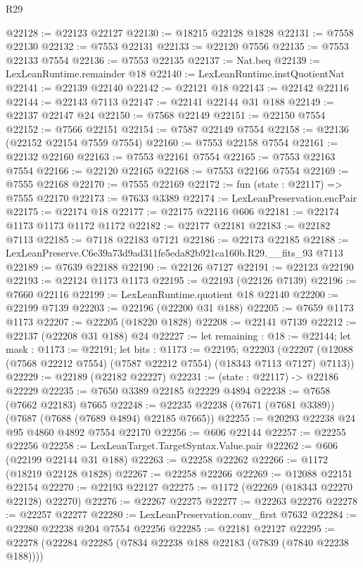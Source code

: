 \begin{lexlean}{R29}
\begin{coremodule}
@22128 := @22123 @22127
@22130 := @18215 @22128 @1828
@22131 := @7558 @22130
@22132 := @7553 @22131
@22133 := @22120 @7556
@22135 := @7553 @22133 @7554
@22136 := @7553 @22135
@22137 := Nat.beq
@22139 := LexLeanRuntime.remainder @18
@22140 := LexLeanRuntime.instQuotientNat
@22141 := @22139 @22140
@22142 := @22121 @18
@22143 := @22142 @22116
@22144 := @22143 @7113
@22147 := @22141 @22144 @31 @188
@22149 := @22137 @22147 @24
@22150 := @7568 @22149
@22151 := @22150 @7554
@22152 := @7566 @22151
@22154 := @7587 @22149 @7554
@22158 := @22136 (@22152 @22154 @7559 @7554)
@22160 := @7553 @22158 @7554
@22161 := @22132 @22160
@22163 := @7553 @22161 @7554
@22165 := @7553 @22163 @7554
@22166 := @22120 @22165
@22168 := @7553 @22166 @7554
@22169 := @7555 @22168
@22170 := @7555 @22169
@22172 := fun (state : @22117) => @7555 @22170
@22173 := @7633 @3389
@22174 := LexLeanPreservation.encPair
@22175 := @22174 @18
@22177 := @22175 @22116 @606
@22181 := @22174 @1173 @1173 @1172 @1172
@22182 := @22177 @22181
@22183 := @22182 @7113
@22185 := @7118 @22183 @7121
@22186 := @22173 @22185
@22188 := LexLeanPreserve.C6e39a73d9ad311fe5eda82b921ca160b.R29.__fits_93 @7113
@22189 := @7639 @22188
@22190 := @22126 @7127
@22191 := @22123 @22190
@22193 := @22124 @1173 @1173
@22195 := @22193 (@22126 @7139)
@22196 := @7660 @22116
@22199 := LexLeanRuntime.quotient @18 @22140
@22200 := @22199 @7139
@22203 := @22196 (@22200 @31 @188)
@22205 := @7659 @1173 @1173
@22207 := @22205 (@18220 @1828)
@22208 := @22141 @7139
@22212 := @22137 (@22208 @31 @188) @24
@22227 := let remaining : @18 := @22144;
  let mask : @1173 := @22191;
  let bits : @1173 := @22195;
  @22203 (@22207 (@12088 (@7568 @22212 @7554) (@7587 @22212 @7554) (@18343 @7113 @7127) @7113))
@22229 := @22189 (@22182 @22227)
@22231 := (state : @22117) -> @22186 @22229
@22235 := @7650 @3389 @22185 @22229 @4894
@22238 := @7658 (@7662 @22183) @7665
@22248 := @22235 @22238 (@7671 (@7681 @3389)) (@7687 (@7688 (@7689 @4894) @22185 @7665))
@22255 := @20293 @22238 @24 @95 @4860 @4892 @7554 @22170
@22256 := @606 @22144
@22257 := @22255 @22256
@22258 := LexLeanTarget.TargetSyntax.Value.pair
@22262 := @606 (@22199 @22144 @31 @188)
@22263 := @22258 @22262
@22266 := @1172 (@18219 @22128 @1828)
@22267 := @22258 @22266
@22269 := @12088 @22151 @22154
@22270 := @22193 @22127
@22275 := @1172 (@22269 (@18343 @22270 @22128) @22270)
@22276 := @22267 @22275
@22277 := @22263 @22276
@22278 := @22257 @22277
@22280 := LexLeanPreservation.conv_first @7632
@22284 := @22280 @22238 @204 @7554 @22256
@22285 := @22181 @22127
@22295 := @22278 (@22284 @22285 (@7834 @22238 @188 @22183 (@7839 (@7840 @22238 @188))))

\end{coremodule}
\end{lexlean}
